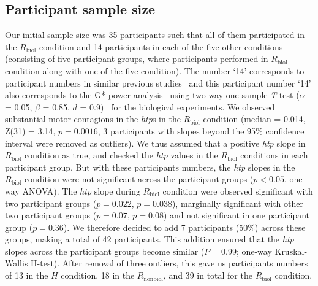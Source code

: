 \subsection{Participant sample size}
Our initial sample size was 35 participants such that all of them participated in the $R_{\text{biol}}$ condition and 14 participants in each of the five other conditions (consisting of five participant groups, where participants performed in $R_{\text{biol}}$ condition along with one of the five condition). The number `14' corresponds to participant numbers in similar previous studies~\cite{Bisio:PlosOne:2010, Bisio:PlosOne:2014} and this participant number `14' also corresponds to the G* power analysis~\cite{Erdfelder:JBRMIC:1996} using two-way one sample {\it T}-test ($\alpha$ = 0.05, $\beta$ = 0.85, $d$ = 0.9)~\cite{Verma:power_analysis:2017} for the biological experiments. We observed substantial motor contagions in the {\it htp}s in the $R_{\text{biol}}$ condition (median = 0.014, Z(31) = 3.14, $p = 0.0016$, 3 participants with slopes beyond the 95\% confidence interval were removed as outliers). We thus assumed that a positive {\it htp} slope in $R_{\text{biol}}$ condition as true, and checked the {\it htp} values in the $R_{\text{biol}}$ conditions in each participant group. But with these participants numbers, the {\it htp} slopes in the $R_{\text{biol}}$ condition were not significant across the participant groups ($p<0.05$, one-way ANOVA). The {\it htp} slope during $R_{\text{biol}}$ condition were observed significant with two participant groups ($p = 0.022$, $p = 0.038$), marginally significant with other two participant groups ($p = 0.07$, $p = 0.08$) and not significant in one participant group ($p = 0.36$). We therefore decided to add 7 participants (50\%) across these groups, making a total of 42 participants. This addition ensured that the {\it htp} slopes across the participant groups become similar ($P = 0.99$; one-way Kruskal-Wallis H-test). After removal of three outliers, this gave us participants numbers of 13 in the $H$ condition, 18 in the $R_{\text{nonbiol}}$, and 39 in total for the $R_{\text{biol}}$ condition.


